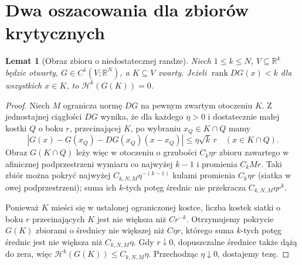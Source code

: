 \documentclass[11pt,a4paper,oneside]{book}
\numberwithin{equation}{chapter}
\theoremstyle{plain}
\newtheorem{lemat}[twierdzenie]{Lemat}
\theoremstyle{definition}
\theoremstyle{remark}
\begin{document}
\section{Dwa oszacowania dla zbiorów krytycznych}
\begin{lemat}[Obraz zbioru o niedostatecznej randze]
\label{lem:critical-area-null-28}
Niech $1\le k\le N$, $V\subseteq\mathbb R^k$ będzie
otwarty, $G\in C^1(V;\mathbb R^N)$, a
$K\subseteq V$ zwarty. Jeżeli
$\operatorname{rank}DG(x)<k$ dla wszystkich $x\in K$,
to $\mathcal H^k(G(K))=0$.
\end{lemat}
\begin{proof}
Niech $M$ ogranicza normę $DG$ na pewnym
zwartym otoczeniu $K$. Z jednostajnej ciągłości
$DG$ wynika, że dla każdego $\eta>0$ i dostatecznie
małej kostki $Q$ o boku $r$, przecinającej $K$,
po wybraniu $x_Q\in K\cap Q$ mamy
\[
 |G(x)-G(x_Q)-DG(x_Q)(x-x_Q)|\le\eta\sqrt k\,r
 \quad(x\in K\cap Q).
\]
Obraz $G(K\cap Q)$ leży więc w otoczeniu o
grzubości $C_k\eta r$ zbioru zawartego
w afinicznej podprzestrzeni wymiaru co najwyżej
$k-1$ i promienia $C_kMr$. Taki zbiór można
pokryć najwyżej $C_{k,N,M}\eta^{-(k-1)}$
kulami promienia $C_k\eta r$ (siatka w owej
podprzestrzeni); suma ich $k$-tych potęg
średnic nie przekracza $C_{k,N,M}\eta r^k$.

Ponieważ $K$ mieści się w ustalonej ograniczonej
kostce, liczba kostek siatki o boku $r$
przecinających $K$ jest nie większa niż $Cr^{-k}$.
Otrzymujemy pokrycie $G(K)$ zbiorami o średnicy
nie większej niż $C\eta r$, którego suma
$k$-tych potęg średnic jest nie większa niż
$C_{k,N,M}\eta$. Gdy $r\downarrow0$, dopuszczalne
średnice także dążą do zera, więc
$\mathcal H^k(G(K))\le C_{k,N,M}\eta$.
Przechodząc $\eta\downarrow0$, dostajemy tezę.
\end{proof}
\end{document}
